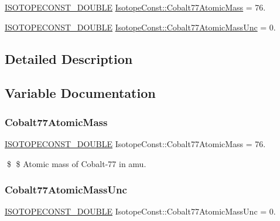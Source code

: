 \begin{DoxyCompactItemize}
\item 
\mbox{\hyperlink{group___isotope_const-_macros_ga8f45a7272ce02c0b4c65c44636ed719a}{I\+S\+O\+T\+O\+P\+E\+C\+O\+N\+S\+T\+\_\+\+D\+O\+U\+B\+LE}} \mbox{\hyperlink{group___isotope_const-_cobalt-_co77_ga9fb19dfc7f730501620e3980f959c135}{Isotope\+Const\+::\+Cobalt77\+Atomic\+Mass}} = 76.
\item 
\mbox{\hyperlink{group___isotope_const-_macros_ga8f45a7272ce02c0b4c65c44636ed719a}{I\+S\+O\+T\+O\+P\+E\+C\+O\+N\+S\+T\+\_\+\+D\+O\+U\+B\+LE}} \mbox{\hyperlink{group___isotope_const-_cobalt-_co77_gaf3d5a8ad319aa51ba4eebb2f2db51ff3}{Isotope\+Const\+::\+Cobalt77\+Atomic\+Mass\+Unc}} = 0.
\end{DoxyCompactItemize}


\subsection{Detailed Description}


\subsection{Variable Documentation}
\mbox{\label{group___isotope_const-_cobalt-_co77_ga9fb19dfc7f730501620e3980f959c135}} 
\subsubsection{\texorpdfstring{Cobalt77\+Atomic\+Mass}{Cobalt77AtomicMass}}
{\footnotesize\ttfamily \mbox{\hyperlink{group___isotope_const-_macros_ga8f45a7272ce02c0b4c65c44636ed719a}{I\+S\+O\+T\+O\+P\+E\+C\+O\+N\+S\+T\+\_\+\+D\+O\+U\+B\+LE}} Isotope\+Const\+::\+Cobalt77\+Atomic\+Mass = 76.}

\$ \$ Atomic mass of Cobalt-\/77 in amu. \mbox{\label{group___isotope_const-_cobalt-_co77_gaf3d5a8ad319aa51ba4eebb2f2db51ff3}} 
\subsubsection{\texorpdfstring{Cobalt77\+Atomic\+Mass\+Unc}{Cobalt77AtomicMassUnc}}
{\footnotesize\ttfamily \mbox{\hyperlink{group___isotope_const-_macros_ga8f45a7272ce02c0b4c65c44636ed719a}{I\+S\+O\+T\+O\+P\+E\+C\+O\+N\+S\+T\+\_\+\+D\+O\+U\+B\+LE}} Isotope\+Const\+::\+Cobalt77\+Atomic\+Mass\+Unc = 0.}

